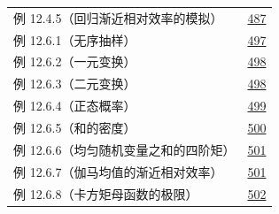 \begin{longtable}{@{}p{}r@{}}
例 12.4.5（回归渐近相对效率的模拟） & \hyperref[ex:12.4.5]{487} \\
例 12.6.1（无序抽样） & \hyperref[ex:12.6.1]{497} \\
例 12.6.2（一元变换） & \hyperref[ex:12.6.2]{498} \\
例 12.6.3（二元变换） & \hyperref[ex:12.6.3]{498} \\
例 12.6.4（正态概率） & \hyperref[ex:12.6.4]{499} \\
例 12.6.5（和的密度） & \hyperref[ex:12.6.5]{500} \\
例 12.6.6（均匀随机变量之和的四阶矩） & \hyperref[ex:12.6.6]{501} \\
例 12.6.7（伽马均值的渐近相对效率） & \hyperref[ex:12.6.7]{501} \\
例 12.6.8（卡方矩母函数的极限） & \hyperref[ex:12.6.8]{502} \\
\end{longtable}

